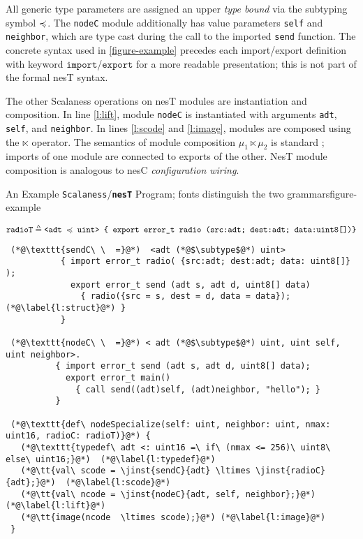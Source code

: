 All generic type parameters are assigned an upper \emph{type bound} via the subtyping symbol
$\preccurlyeq$. The \texttt{nodeC} module additionally has value parameters \texttt{self} and
\texttt{neighbor}, which are type cast during the call to the imported \texttt{send} function.
The concrete syntax used in \autoref{figure-example} precedes each import/export definition with
keyword $\texttt{import}$/$\texttt{export}$ for a more readable presentation; this is not part
of the formal nesT syntax.
  
The other Scalaness operations on nesT modules are instantiation and composition. In line
\ref{l:lift}, module \texttt{nodeC} is instantiated with arguments \texttt{adt}, \texttt{self},
and \texttt{neighbor}. In lines \ref{l:scode} and \ref{l:image}, modules are composed using the
$\ltimes$ operator. The semantics of module composition $\mu_1 \ltimes \mu_2$ is standard
\cite{Cardelli-1997}; imports of one module are connected to exports of the other. NesT module
composition is analogous to nesC \emph{configuration wiring}.

\begin{fpfig*}[t]{An Example \texttt{Scalaness}/{\bf \texttt{nesT}} Program; fonts distinguish the two grammars}{figure-example}
\lstset{numbers=left, numberstyle=\tiny, stepnumber=1, numbersep=5pt, basicstyle=\ttfamily} 

{\scriptsize\bf
$$
\texttt{radioT} \triangleq \texttt{<adt $\preccurlyeq$ uint> \{ export error\_t radio ({src:adt; dest:adt; data:uint8[]})\}} 
$$
\begin{lstlisting}
 (*@\texttt{sendC\ \  =}@*)  <adt (*@$\subtype$@*) uint>  
           { import error_t radio( {src:adt; dest:adt; data: uint8[]} );       
             export error_t send (adt s, adt d, uint8[] data) 
               { radio({src = s, dest = d, data = data}); (*@\label{l:struct}@*) }
           }
 
 (*@\texttt{nodeC\ \  =}@*) < adt (*@$\subtype$@*) uint, uint self, uint neighbor>.
          { import error_t send (adt s, adt d, uint8[] data); 
            export error_t main() 
              { call send((adt)self, (adt)neighbor, "hello"); }   
          }
 
 (*@\texttt{def\ nodeSpecialize(self: uint, neighbor: uint, nmax: uint16, radioC: radioT)}@*) {
   (*@\texttt{typedef\ adt <: uint16 =\ if\ (nmax <= 256)\ uint8\ else\ uint16;}@*)  (*@\label{l:typedef}@*)   
   (*@\tt{val\ scode = \jinst{sendC}{adt} \ltimes \jinst{radioC}{adt};}@*)  (*@\label{l:scode}@*)    
   (*@\tt{val\ ncode = \jinst{nodeC}{adt, self, neighbor};}@*) (*@\label{l:lift}@*)    
   (*@\tt{image(ncode  \ltimes scode);}@*) (*@\label{l:image}@*)   
 }
\end{lstlisting}
}
\end{fpfig*}


